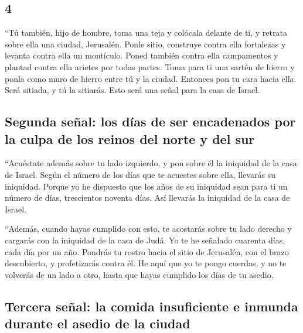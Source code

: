 \begin{paracol}{2}
\hypertarget{section-6}{%
\section{4}\label{section-6}}

 ``Tú también, hijo de hombre, toma una teja y colócala
delante de ti, y retrata sobre ella una ciudad, Jerusalén.
 Ponle sitio, construye contra ella fortalezas y levanta
contra ella un montículo. Poned también contra ella campamentos y
plantad contra ella arietes por todas partes.  Toma para
ti una sartén de hierro y ponla como muro de hierro entre tú y la
ciudad. Entonces pon tu cara hacia ella. Será sitiada, y tú la sitiarás.
Esto será una señal para la casa de Israel.

\hypertarget{segunda-seuxf1al-los-duxedas-de-ser-encadenados-por-la-culpa-de-los-reinos-del-norte-y-del-sur}{%
\subsection{Segunda señal: los días de ser encadenados por la culpa de
los reinos del norte y del
sur}\label{segunda-seuxf1al-los-duxedas-de-ser-encadenados-por-la-culpa-de-los-reinos-del-norte-y-del-sur}}

 ``Acuéstate además sobre tu lado izquierdo, y pon sobre
él la iniquidad de la casa de Israel. Según el número de los días que te
acuestes sobre ella, llevarás su iniquidad.  Porque yo he
dispuesto que los años de su iniquidad sean para ti un número de días,
trescientos noventa días. Así llevarás la iniquidad de la casa de
Israel.

 ``Además, cuando hayas cumplido con esto, te acostarás
sobre tu lado derecho y cargarás con la iniquidad de la casa de Judá. Yo
te he señalado cuarenta días, cada día por un año. 
Pondrás tu rostro hacia el sitio de Jerusalén, con el brazo descubierto,
y profetizarás contra él.  He aquí que yo te pongo
cuerdas, y no te volverás de un lado a otro, hasta que hayas cumplido
los días de tu asedio.

\hypertarget{tercera-seuxf1al-la-comida-insuficiente-e-inmunda-durante-el-asedio-de-la-ciudad}{%
\subsection{Tercera señal: la comida insuficiente e inmunda durante el
asedio de la
ciudad}\label{tercera-seuxf1al-la-comida-insuficiente-e-inmunda-durante-el-asedio-de-la-ciudad}}


\end{paracol}
